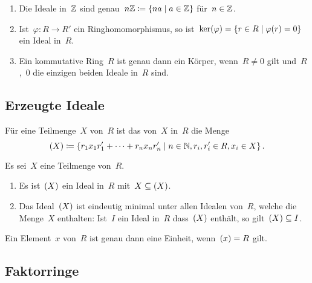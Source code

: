\begin{example}
  \leavevmode
  \begin{enumerate}
    \item
      Die Ideale in~$\mathbb{Z}$ sind genau~$n \Integer \defined \{ na \suchthat a \in \Integer \}$ für~$n \in \mathbb{Z}$.
    \item
      Ist~$\varphi \colon R \to R'$ ein Ringhomomorphismus, so ist~$\ker(\varphi) = \{ r \in R \suchthat \varphi(r) = 0 \}$ ein Ideal in~$R$.
    \item
      Ein kommutative Ring~$R$ ist genau dann ein Körper, wenn~$R \neq 0$ gilt und~$R$,~$0$ die einzigen beiden Ideale in~$R$ sind.
  \end{enumerate}
\end{example}



\subsection{Erzeugte Ideale}

\begin{definition}
  Für eine Teilmenge~$X$ von~$R$ ist das von~$X$ in~$R$  die Menge
  \[
    \genideal{X}
    \defined
    \{
      r_1 x_1 r'_1 + \dotsb + r_n x_n r'_n
    \suchthat
      n \in \Natural,
      r_i, r'_i \in R,
      x_i \in X
    \} \,.
  \]
\end{definition}

\begin{proposition}
  Es sei~$X$ eine Teilmenge von~$R$.
  \begin{enumerate}
    \item
      Es ist~$(X)$ ein Ideal in~$R$ mit~$X \subseteq (X)$.
    \item
      Das Ideal~$(X)$ ist eindeutig minimal unter allen Idealen von~$R$, welche die Menge~$X$ enthalten:
      Ist~$I$ ein Ideal in~$R$ dass~$(X)$ enthält, so gilt~$(X) \subseteq I$.
  \end{enumerate}
\end{proposition}

\begin{proposition}
  Ein Element~$x$ von~$R$ ist genau dann eine Einheit, wenn~$(x) = R$ gilt.
\end{proposition}



\subsection{Faktorringe}

